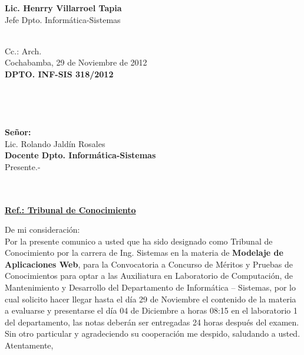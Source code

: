 \documentclass[letterpaper,11pt]{letter}
\begin{document}
\vspace{3.5cm}
\begin{center}
\begin{minipage}[b]{0.5\textwidth}
\begin{center}
{\bf Lic. Henrry Villarroel Tapia}\\
Jefe Dpto. Informática-Sistemas\\
\end{center}
\end{minipage}
\end{center}
~\\
Cc.: Arch.\\
\newpage
Cochabamba, 29 de Noviembre de 2012~\\
 \textbf{DPTO. INF-SIS 318/2012}\\
~\\
~\\
~\\
~\\
 \textbf{Señor:}~\\
Lic. Rolando Jaldín Rosales~\\
 \textbf{Docente Dpto. Informática-Sistemas}~\\
Presente.-\\
~\\
~\\
\begin{center}
\underline{ \textbf{Ref.: Tribunal de Conocimiento}}
\end{center}
De mi consideración:\\
Por la presente comunico a usted que ha sido designado como Tribunal de Conocimiento por la carrera de Ing. Sistemas en la materia de \textbf{Modelaje de Aplicaciones Web}, para la Convocatoria a Concurso de Méritos y Pruebas de Conocimientos para optar a las Auxiliatura en Laboratorio de Computación, de Mantenimiento y Desarrollo del Departamento de Informática – Sistemas, por lo cual solicito hacer llegar hasta el día 29 de Noviembre el contenido de la materia a evaluarse y presentarse el día 04 de Diciembre a horas 08:15 en el laboratorio 1 del departamento, las notas deberán ser entregadas 24 horas después del examen.\\
Sin otro particular y agradeciendo su cooperación me despido, saludando a usted.\\
Atentamente,\\
\end{document}
